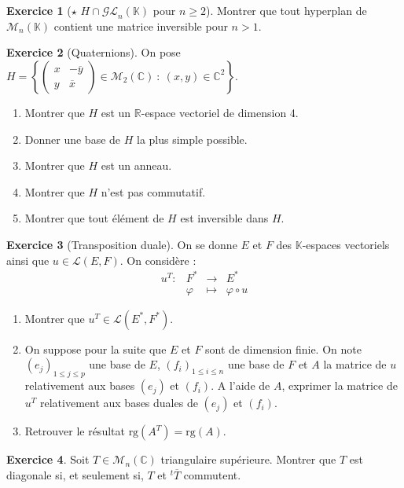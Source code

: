 \documentclass[french]{book}
\newcommand{\R}{\mathbb{R}}
\newcommand{\C}{\mathbb{C}}
\newcommand{\K}{\mathbb{K}}
\newcommand{\st}{^*}
\theoremstyle{definition}
\newtheorem{ex}{Exercice}[chapter]
\theoremstyle{theorem}
\theoremstyle{remark}
\begin{document}
\begin{ex}[$\star$ $H\cap\mathcal{GL}_n(\K)$ pour $n\geqslant 2$] Montrer que tout hyperplan de $\mathcal{M}_n(\K)$ contient une matrice inversible pour $n>1$.
\end{ex}

\begin{ex}[Quaternions]
	On pose $H=\displaystyle\left\{\begin{pmatrix}
		x&-\overline{y} \\
		y&\overline{x}
	\end{pmatrix}\in\mathcal{M}_2(\C)\ : \ (x,y)\in\C^2\right\}$.
	\begin{enumerate}
		\item Montrer que $H$ est un $\R$-espace vectoriel de dimension 4.
		\item Donner une base de $H$ la plus simple possible.
		\item Montrer que $H$ est un anneau.
		\item Montrer que $H$ n'est pas commutatif.
		\item Montrer que tout élément de $H$ est inversible dans $H$.
	\end{enumerate}
\end{ex}

\begin{ex}[Transposition duale]
	On se donne $E$ et $F$ des $\K$-espaces vectoriels ainsi que $u\in\mathcal{L}(E,F)$. On considère : $$\begin{array}{lrcl}
		u^T:&F\st&\longrightarrow&E\st \\
		&\varphi&\longmapsto&\varphi\circ u
	\end{array}$$
	\begin{enumerate}
		\item Montrer que $u^T\in\mathcal{L}(E\st,F\st)$.
		\item On suppose pour la suite que $E$ et $F$ sont de dimension finie. On note $(e_j)_{1\leqslant j\leqslant p}$ une base de $E$, $(f_i)_{1\leqslant i\leqslant n}$ une base de $F$ et $A$ la matrice de $u$ relativement aux bases $(e_j)$ et $(f_i)$. A l'aide de $A$, exprimer la matrice de $u^T$ relativement aux bases duales de $(e_j)$ et $(f_i)$.
		\item Retrouver le résultat $\text{rg}(A^T)=\text{rg}(A)$.
	\end{enumerate}
\end{ex}

\begin{ex}
	Soit $T\in\mathcal{M}_n(\C)$ triangulaire supérieure. Montrer que $T$ est diagonale si, et seulement si, $T$ et $^t\overline{T}$ commutent.
\end{ex}
\end{document}
